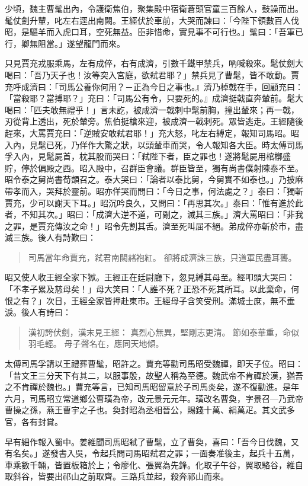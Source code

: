 少頃，魏主曹髦出內，令護衛焦伯，聚集殿中宿衛蒼頭官童三百餘人，鼓譟而出。髦仗劍升輦，叱左右逕出南闕。王經伏於車前，大哭而諫曰：「今陛下領數百人伐昭，是驅羊而入虎口耳，空死無益。臣非惜命，實見事不可行也。」髦曰：「吾軍已行，卿無阻當。」遂望龍門而來。

只見賈充戎服乘馬，左有成倅，右有成濟，引數千鐵甲禁兵，吶喊殺來。髦仗劍大喝曰：「吾乃天子也！汝等突入宮庭，欲弒君耶？」禁兵見了曹髦，皆不敢動。賈充呼成濟曰：「司馬公養你何用？－正為今日之事也。』濟乃棹戟在手，回顧充曰：「當殺耶？當搏耶？」充曰：「司馬公有令，只要死的。』成濟挺戟直奔輦前。髦大喝曰：「匹夫敢無禮乎！」言未訖，被成濟一戟刺中髦前胸，撞出輦來；再一戟，刃從背上透出，死於輦旁。焦伯挺槍來迎，被成濟一戟刺死。眾皆逃走。王經隨後趕來，大罵賈充曰：「逆賊安敢弒君耶！」充大怒，叱左右縛定，報知司馬昭。昭入內，見髦已死，乃佯作大驚之狀，以頭輦車而哭，令人報知各大臣。時太傅司馬孚入內，見髦屍首，枕其股而哭曰：「弒陛下者，臣之罪也！遂將髦屍用棺槨盛貯，停於偏殿之西。昭入殿中，召群臣會議。群臣皆至，獨有尚書僕射陳泰不至。昭令泰之舅尚書荀顗召之。泰大哭曰：「論者以泰比舅，今舅實不如泰也。」乃披麻帶孝而入，哭拜於靈前。昭亦佯哭而問曰：「今日之事，何法處之？」泰曰：「獨斬賈充，少可以謝天下耳。」昭沉吟良久，又問曰：「再思其次。」泰曰：「惟有進於此者，不知其次。」昭曰：「成濟大逆不道，可剮之，滅其三族。」濟大罵昭曰：「非我之罪，是賈充傳汝之命！」昭令先割其舌。濟至死叫屈不絕。弟成倅亦斬於市，盡滅三族。後人有詩歎曰：

\begin{quote}
司馬當年命賈充，弒君南闕赭袍紅。
卻將成濟誅三族，只道軍民盡耳聾。
\end{quote}

昭又使人收王經全家下獄。王經正在廷尉廳下，忽見縛其母至。經叩頭大哭曰：「不孝子累及慈母矣！」母大笑曰：「人誰不死？正恐不死其所耳。以此棄命，何恨之有？」次日，王經全家皆押赴東市。王經母子含笑受刑。滿城士庶，無不垂淚。後人有詩曰：

\begin{quote}
漢初誇伏劍，漢末見王經：
真烈心無異，堅剛志更清。
節如泰華重，命似羽毛輕。
母子聲名在，應同天地傾。
\end{quote}

太傅司馬孚請以王禮葬曹髦，昭許之。賈充等勸司馬昭受魏禪，即天子位。昭曰：「昔文王三分天下有其二，以服事殷，故聖人稱為至德。魏武帝不肯禪於漢，猶吾之不肯禪於魏也。」賈充等言，已知司馬昭留意於子司馬炎矣，遂不復勸進。是年六月，司馬昭立常道鄉公曹璜為帝，改元景元元年。璜改名曹奐，字景召—乃武帝曹操之孫，燕王曹宇之子也。奐封昭為丞相晉公，賜錢十萬、絹萬疋。其文武多官，各有封賞。

早有細作報入蜀中。姜維聞司馬昭弒了曹髦，立了曹奐，喜曰：「吾今日伐魏，又有名矣。」遂發書入吳，令起兵問司馬昭弒君之罪；一面奏准後主，起兵十五萬，車乘數千輛，皆置板箱於上；令廖化、張翼為先鋒。化取子午谷，翼取駱谷，維自取斜谷，皆要出祁山之前取齊。三路兵並起，殺奔祁山而來。

